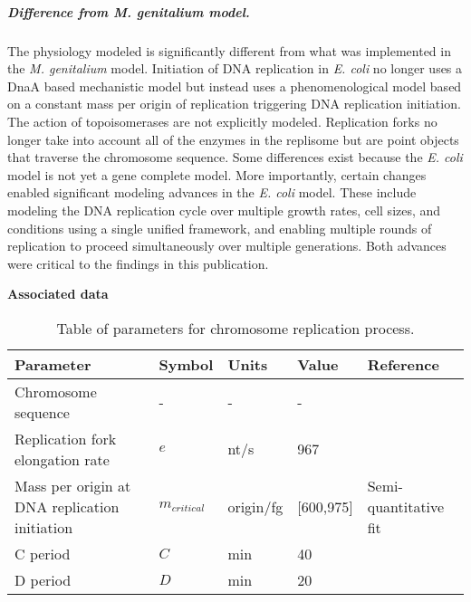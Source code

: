 \documentclass[12pt]{article}
\begin{document}
\subparagraph{Difference from \emph{M. genitalium} model.}
The physiology modeled is significantly different from what was implemented in the \emph{M. genitalium} model. Initiation of DNA replication in \emph{E. coli} no longer uses a DnaA based mechanistic model but instead uses a phenomenological model based on a constant mass per origin of replication triggering DNA replication initiation. The action of topoisomerases are not explicitly modeled. Replication forks no longer take into account all of the enzymes in the replisome but are point objects that traverse the chromosome sequence. Some differences exist because the \emph{E. coli} model is not yet a gene complete model.  More importantly, certain changes enabled significant modeling advances in the \emph{E. coli} model. These include modeling the DNA replication cycle over multiple growth rates, cell sizes, and conditions using a single unified framework, and enabling multiple rounds of replication to proceed simultaneously over multiple generations. Both advances were critical to the findings in this publication.


\textbf{Associated data}

\begin{table}[h!]
 \centering
 \begin{tabular}{p{1.75in} p{1in} p{1in} p{1in} p{1in}} 
 \hline
 Parameter & Symbol & Units & Value & Reference \\
 \hline
Chromosome sequence & - & - & - & \cite{Blattner:1997wl} \\
Replication fork elongation rate & $e$ & nt/s & 967 & \cite{Bremer:1996uj} \\
Mass per origin at DNA replication initiation & $m_{critical}$ & origin/fg & [600,975] & Semi-quantitative fit \cite{Donachie:1968vp} \\
C period & $C$ & min & 40 & \cite{Neidhardt:1990tna} \\
D period & $D$ & min & 20 & \cite{Neidhardt:1990tna} \\

 \hline
\end{tabular}
\caption[Table of parameters for chromosome replication]{Table of parameters for chromosome replication process.
}
\end{table}

\newpage

\label{sec:references}


\end{document}
